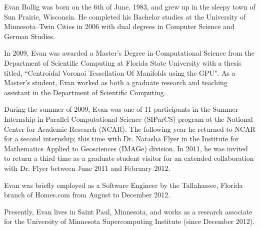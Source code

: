 \begin{biosketch}

Evan Bollig was born on the 6th of June, 1983, and grew up in the sleepy town of Sun Prairie, Wisconsin. He completed his Bachelor studies at the University of Minnesota--Twin Cities in 2006 with dual degrees in Computer Science and German Studies. 

In 2009, Evan was awarded a Master's Degree in Computational Science from the Department of Scientific Computing at Florida State University with a thesis titled, ``Centroidal Voronoi Tessellation Of Manifolds using the GPU". As a Master's student, Evan worked as both a graduate research and teaching assistant in the Department of Scientific Computing.

During the summer of 2009, Evan was one of 11 participants in the Summer Internship in Parallel Computational Science (SIParCS) program at the National Center for Academic Research (NCAR). The following year he returned to NCAR for a second internship; this time with Dr. Natasha Flyer in the Institute for Mathematics Applied to Geosciences (IMAGe) division. In 2011, he was invited to return a third time as a graduate student visitor for an extended collaboration with Dr. Flyer between June 2011 and February 2012. 

Evan was briefly employed as a Software Engineer by the Tallahassee, Florida branch of Homes.com from August to December 2012. 

Presently, Evan lives in Saint Paul, Minnesota, and works as a research associate for the University of Minnesota Supercomputing Institute (since December 2012). 


\end{biosketch}